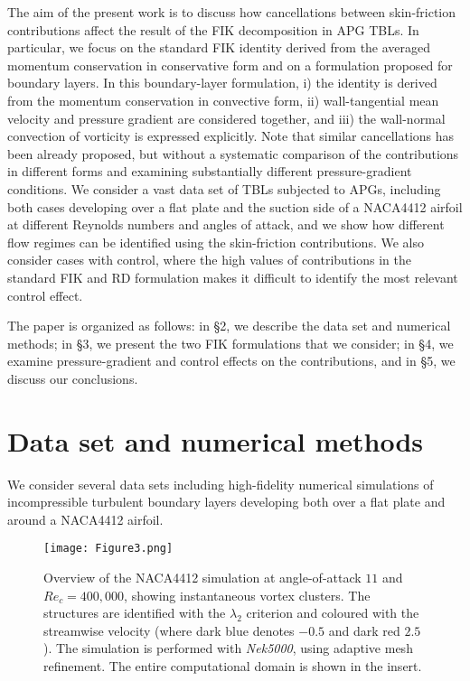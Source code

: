 The aim of the present work is to discuss how cancellations between skin-friction contributions affect the result of the FIK decomposition in APG TBLs. In particular, we focus on the standard FIK identity derived from the averaged momentum conservation in conservative form and on a formulation proposed for boundary layers. In this boundary-layer formulation, i) the identity is derived from the momentum conservation in convective form, ii) wall-tangential mean velocity and pressure gradient are considered together, and iii) the wall-normal convection of vorticity is expressed explicitly. Note that similar cancellations has been already proposed\cite{atzo21,wenz22}, but without a systematic comparison of the contributions in different forms and examining substantially different pressure-gradient conditions. We consider a vast data set of TBLs subjected to APGs, including both cases developing over a flat plate and the suction side of a NACA4412 airfoil at different Reynolds numbers and angles of attack, and we show how different flow regimes can be identified using the skin-friction contributions. We also consider cases with control, where the high values of contributions in the standard FIK and RD formulation makes it difficult to identify the most relevant control effect\cite{atzo21}.

The paper is organized as follows: in \S2, we describe the data set and numerical methods; in \S3, we present the two FIK formulations that we consider; in \S4, we examine pressure-gradient and control effects on the contributions, and in \S5, we discuss our conclusions.


\section{Data set and numerical methods}
We consider several data sets including high-fidelity numerical simulations of incompressible turbulent boundary layers developing both over a flat plate and around a NACA4412 airfoil. 

\begin{figure}
\centering
\texttt{[image: Figure3.png]}
\caption{\label{fig:nice} Overview of the NACA4412 simulation at angle-of-attack $11$ and $Re_c=400,000$, showing instantaneous vortex clusters. The structures are identified with the $\lambda_2$ criterion\cite{jeon95} and coloured with the streamwise velocity (where dark blue denotes $-0.5$ and dark red $2.5$). The simulation is performed with \textit{Nek5000}\cite{fischer2008nek5000}, using adaptive mesh refinement\cite{tanarro2020enabling}. The entire computational domain is shown in the insert.}
\end{figure}

